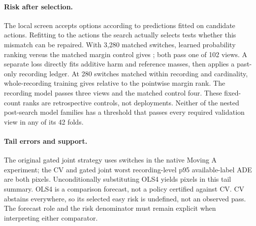 \paragraph{Risk after selection.}
The local screen accepts options according to predictions fitted on
candidate actions. Refitting to the actions the search actually selects
tests whether this mismatch can be repaired. With 3,280 matched
switches, learned probability ranking versus the matched margin
control gives \PostRiskContrast; both pass one of 102 views.
A separate loss directly fits additive harm and reference masses,
then applies a past-only recording ledger. At 280 switches matched
within recording and cardinality, whole-recording training gives
\PostMassContrast{} relative to the pointwise margin rank. The
recording model passes three views and the matched control four.
These fixed-count ranks are retrospective controls, not deployments.
Neither of the nested post-search model families has a threshold
that passes every required validation view in any of its 42 folds.

\paragraph{Tail errors and support.}
The original gated joint strategy uses \GateSwitches{} switches in
the native Moving A experiment; the CV and gated joint worst
recording-level p95 available-label ADE are both \TailCV{} pixels.
Unconditionally substituting OLS4 yields \TailOLS{} pixels in this
tail summary. OLS4 is a comparison forecast, not a policy certified
against CV. CV abstains everywhere, so its selected easy risk is
undefined, not an observed pass. The forecast role and the risk
denominator must remain explicit when interpreting either comparator.
